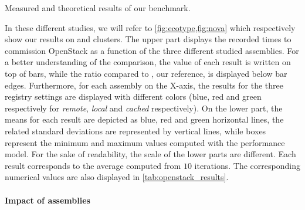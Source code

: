 \begin{table}
    \begin{center}
        
        \caption{Measured and theoretical results of our benchmark.}
        \label{tab:openstack_results}
    \end{center}
\end{table}

In these different studies, we will refer to
\cref{fig:ecotype,fig:nova} which respectively show our results on
\ecotype and \nova clusters. The upper part displays the recorded
times to commission OpenStack as a function of the three different
studied assemblies. For a better understanding of the comparison, the
value of each result is written on top of bars, while the ratio
compared to \ansass, our reference, is displayed below bar edges.
Furthermore, for each assembly on the X-axis, the results for the
three \docker registry settings are displayed with different colors
(\ie blue, red and green respectively for \emph{remote}, \emph{local}
and \emph{cached} respectively). On the lower part, the means for each
result are depicted as blue, red and green horizontal lines, the
related standard deviations are represented by vertical lines, while
boxes represent the minimum and maximum values computed with the
performance model.
% 
%
For the sake of readability, the scale of the
lower parts are different. Each result corresponds to the average
computed from $10$ iterations. The corresponding numerical values are
also displayed in \cref{tab:openstack_results}.

\paragraph{Impact of assemblies}

